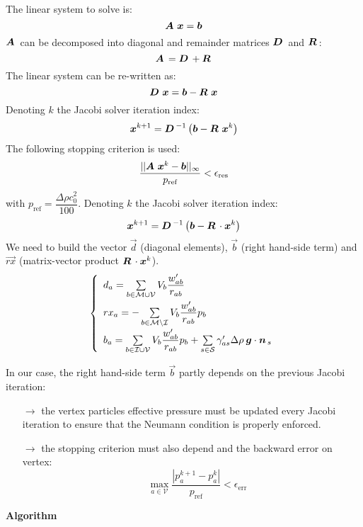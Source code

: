 \documentclass{../GPUSPHtemplate}
\begin{document}
The linear system to solve is:
\[\bm{\bm{A}}\, \, \bm{x} = \bm{b} \]
%
$\bm{\bm{A}}\,$ can be decomposed into diagonal and remainder matrices $\bm{\bm{D}}\,$ and $\bm{\bm{R}}\,$:
\[ \bm{\bm{A}}\,  = \bm{\bm{D}}\, + \bm{\bm{R}}\, \]
%
The linear system can be re-written as:
\[\bm{\bm{D}}\, \, \bm{x} = \bm{b} - \bm{\bm{R}}\, \, \bm{x}\]
%
Denoting $k$ the Jacobi solver iteration index:
\[ \bm{x}^{k+1} = \bm{\bm{D}}\,^{-1} \left( \bm{b} - \bm{\bm{R}}\,\, \bm{x}^{k} \right) \]
%
The following stopping criterion is used:
\[ \dfrac{|| \bm{\bm{A}}\, \, \bm{x}^{k} - \bm{b} ||_\infty}{p_{\text{ref}}} < \epsilon_\text{res}\]
%
with $p_{\text{ref}} = \dfrac{\Delta\rho c_0^2}{100}$.
%
Denoting $k$ the Jacobi solver iteration index:
\[ \bm{x}^{k+1} = \bm{\bm{D}}\,^{-1} \left( \bm{b} - \bm{\bm{R}}\,\cdot \bm{x}^{k} \right) \]
%
We need to build the vector $\vec{d}$ (diagonal elements), $\vec{b}$ (right hand-side term) and $\vec{rx}$ (matrix-vector product $\bm{\bm{R}}\,\cdot \bm{x}^{k}$).
%
\[ \left\lbrace
\begin{array}{l}
d_{a} = \sum\limits_{b\in \mathcal{M} \cup \mathcal{V}} V_b \dfrac{w_{ab}'}{r_{ab}} \\[1em]
rx_{a} = -\sum\limits_{b\in \mathcal{M} \setminus \mathcal{I}} V_b \dfrac{w_{ab}'}{r_{ab}} p_b \\[1em]
b_a = \sum\limits_{b \in \mathcal{I} \cup \mathcal{V}} V_b \dfrac{w_{ab}'}{r_{ab}} p_b + \sum\limits_{s\in \mathcal{S}} \gamma_{as}' \Delta \rho \: \bm{g} \cdot \bm{n}_{\,s}
\end{array} \right. \]
%

In our case, the right hand-side term $\vec{b}$ partly depends on the previous Jacobi iteration:
\begin{itemize}
\item[$\rightarrow$] the vertex particles effective pressure must be updated every Jacobi iteration to ensure that the Neumann condition is properly enforced.
\item[$\rightarrow$] the stopping criterion must also depend and the backward error on vertex:
\[ \quad \max\limits_{a \in \mathcal{V}} \dfrac{|p_a^{k+1} - p_a^{k}|}{p_{\text{ref}}} < \epsilon_\text{err} \]
%
%
\end{itemize}

\textbf{Algorithm} \\
\vspace*{0.25cm}
\end{document}

